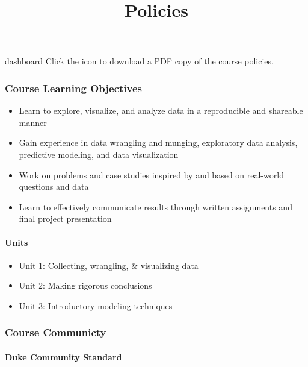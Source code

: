 \documentclass[]{article}
\title{Policies}
\author{}
\date{\vspace{-2.5em}}
\providecommand{\tightlist}{%
  \setlength{\itemsep}{0pt}\setlength{\parskip}{0pt}}
\let\oldparagraph\paragraph
\renewcommand{\paragraph}[1]{\oldparagraph{#1}\mbox{}}
\begin{document}
\maketitle

dashboard Click the icon to download a PDF copy of the course policies.

\hypertarget{course-learning-objectives}{%
\subsubsection{Course Learning
Objectives}\label{course-learning-objectives}}

\begin{itemize}
\tightlist
\item
  Learn to explore, visualize, and analyze data in a reproducible and
  shareable manner
\item
  Gain experience in data wrangling and munging, exploratory data
  analysis, predictive modeling, and data visualization
\item
  Work on problems and case studies inspired by and based on real-world
  questions and data
\item
  Learn to effectively communicate results through written assignments
  and final project presentation
\end{itemize}

\hypertarget{units}{%
\paragraph{Units}\label{units}}

\begin{itemize}
\tightlist
\item
  Unit 1: Collecting, wrangling, \& visualizing data
\item
  Unit 2: Making rigorous conclusions
\item
  Unit 3: Introductory modeling techniques
\end{itemize}

\hypertarget{course-communicty}{%
\subsubsection{Course Communicty}\label{course-communicty}}

\hypertarget{duke-community-standard}{%
\paragraph{Duke Community Standard}\label{duke-community-standard}}
\end{document}
